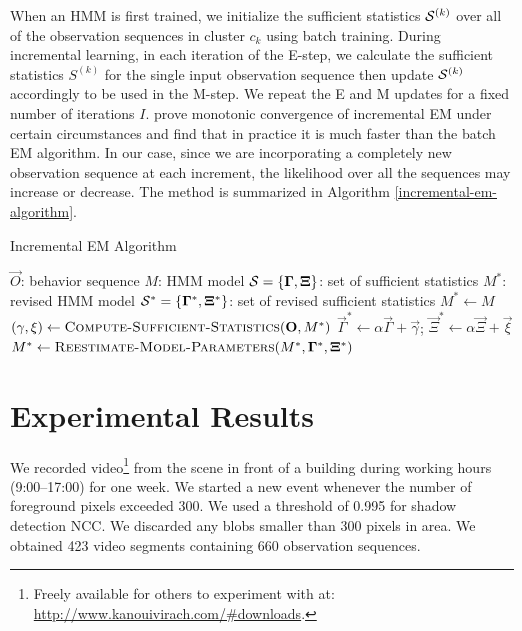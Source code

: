 When an HMM is first trained, we initialize the sufficient statistics
${\cal S}^{(k)}$ over all of the observation sequences in cluster
$c_k$ using batch training. During incremental learning, in each
iteration of the E-step, we calculate the sufficient statistics
$S^{(k)}$ for the single input observation sequence then update ${\cal
S}^{(k)}$ accordingly to be used in the M-step.  We repeat the E and M
updates for a fixed number of iterations $I$. 
prove monotonic convergence of incremental EM under certain
circumstances and find that in practice it is much faster than the
batch EM algorithm. In our case, since we are incorporating a
completely new observation sequence at each increment, the likelihood
over all the sequences may increase or decrease.  The method is
summarized in Algorithm \ref{incremental-em-algorithm}.

\begin{algorithm}[t]
  \caption{Incremental EM Algorithm}
  \label{incremental-em-algorithm}
  \begin{algorithmic}
    \REQUIRE $\vec{O}$: behavior sequence
    \REQUIRE $M$: HMM model
    \REQUIRE ${\cal S} = \{ \vec{\Gamma}, \vec{\Xi} \}$: set of sufficient statistics
    \ENSURE $M^*$: revised HMM model
    \ENSURE ${\cal S}^* = \{ \vec{\Gamma}^*, \vec{\Xi}^* \}$: set of revised sufficient statistics
    \STATE $M^* \gets M$
      \STATE {}
      \STATE $(\vec{\gamma}, \vec{\xi}) \gets \textsc{Compute-Sufficient-Statistics}(\vec{O}, M^*)$
      \STATE $\vec{\Gamma}^* \gets \alpha \vec{\Gamma} + \vec{\gamma}$; \;
      $\vec{\Xi}^* \gets \alpha \vec{\Xi} + \vec{\xi}$
      \STATE {}
      \STATE $M^* \gets \textsc{Reestimate-Model-Parameters}(M^*, \vec{\Gamma}^*, \vec{\Xi}^*)$
    \ENDFOR
  \end{algorithmic}
\end{algorithm}

\section{Experimental Results}
\label{incremental-results}

We recorded video\footnote{\small Freely available for others to experiment 
with at: \url{http://www.kanouivirach.com/#downloads}.}
from the scene in front of a building during working hours
(9:00--17:00) for one week.  We started a new event whenever the
number of foreground pixels exceeded 300.  We used a threshold of
0.995 for shadow detection NCC.  We discarded any blobs smaller than
300 pixels in area. We obtained 423 video segments containing 660
observation sequences.


